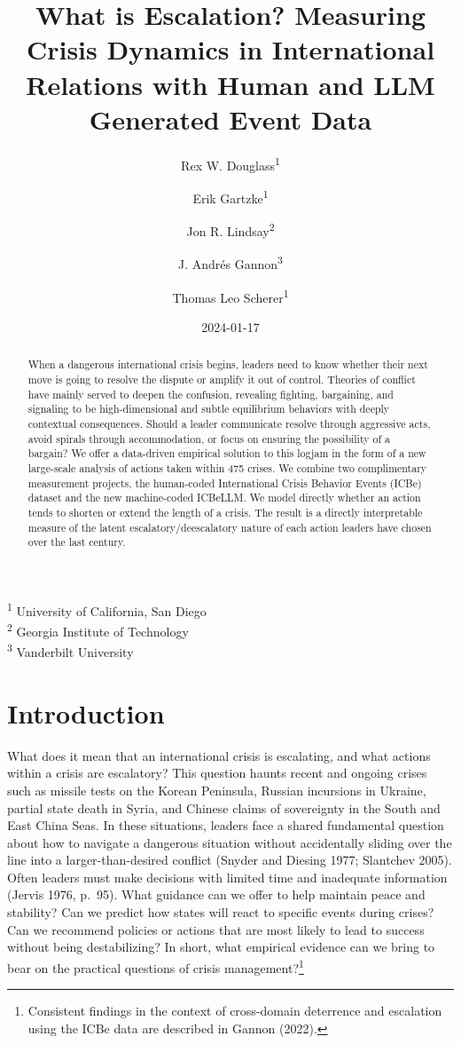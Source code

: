\documentclass[
  letterpaper,
  DIV=11,
  numbers=noendperiod]{scrartcl}
\title{What is Escalation? Measuring Crisis Dynamics in International
Relations with Human and LLM Generated Event Data}
\author{Rex W. Douglass\textsuperscript{1} \and Erik
Gartzke\textsuperscript{1} \and Jon R.
Lindsay\textsuperscript{2} \and J. Andrés
Gannon\textsuperscript{3} \and Thomas Leo Scherer\textsuperscript{1}}
\date{2024-01-17}
\begin{document}
\maketitle
\begin{abstract}
When a dangerous international crisis begins, leaders need to know
whether their next move is going to resolve the dispute or amplify it
out of control. Theories of conflict have mainly served to deepen the
confusion, revealing fighting, bargaining, and signaling to be
high-dimensional and subtle equilibrium behaviors with deeply contextual
consequences. Should a leader communicate resolve through aggressive
acts, avoid spirals through accommodation, or focus on ensuring the
possibility of a bargain? We offer a data-driven empirical solution to
this logjam in the form of a new large-scale analysis of actions taken
within 475 crises. We combine two complimentary measurement projects,
the human-coded International Crisis Behavior Events (ICBe) dataset and
the new machine-coded ICBeLLM. We model directly whether an action tends
to shorten or extend the length of a crisis. The result is a directly
interpretable measure of the latent escalatory/deescalatory nature of
each action leaders have chosen over the last century.
\end{abstract}

\textsuperscript{1} University of California, San Diego\\
\textsuperscript{2} Georgia Institute of Technology\\
\textsuperscript{3} Vanderbilt University

\section{Introduction}\label{introduction}

What does it mean that an international crisis is escalating, and what
actions within a crisis are escalatory? This question haunts recent and
ongoing crises such as missile tests on the Korean Peninsula, Russian
incursions in Ukraine, partial state death in Syria, and Chinese claims
of sovereignty in the South and East China Seas. In these situations,
leaders face a shared fundamental question about how to navigate a
dangerous situation without accidentally sliding over the line into a
larger-than-desired conflict (Snyder and Diesing 1977; Slantchev 2005).
Often leaders must make decisions with limited time and inadequate
information (Jervis 1976, p.~95). What guidance can we offer to help
maintain peace and stability? Can we predict how states will react to
specific events during crises? Can we recommend policies or actions that
are most likely to lead to success without being destabilizing? In
short, what empirical evidence can we bring to bear on the practical
questions of crisis management?\footnote{Consistent findings in the
  context of cross-domain deterrence and escalation using the ICBe data
  are described in Gannon (2022).}
\end{document}
